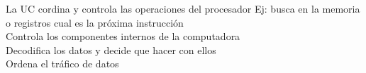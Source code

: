 \documentclass[preview]{standalone}
\begin{document}
La UC cordina y controla las operaciones del procesador                            Ej: busca en la memoria o registros cual es la próxima instrucción\\Controla los componentes internos de la computadora\\Decodifica los datos y decide que hacer con ellos\\Ordena el tráfico de datos\\
\end{document}
